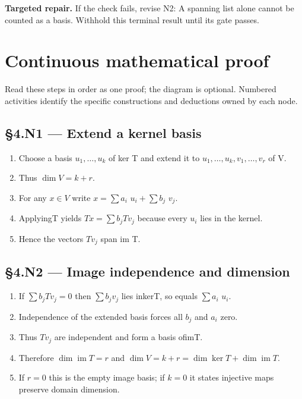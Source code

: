 \documentclass[preprint,12pt,aps,pra,showkeys,amsmath,amssymb,superscriptaddress,floatfix]{revtex4-2}
\theoremstyle{definition}
\theoremstyle{remark}
\newcommand{\field}[2]{\par\smallskip\noindent\textbf{#1.} #2\par}
\begin{document}
\field{Targeted repair}{If the check fails, revise N2: A spanning list alone cannot be counted
as a basis. Withhold this terminal result until its gate passes.}

\endgroup\clearpage\section{Continuous mathematical proof}\label{sec:proof}

Read these steps in order as one proof; the diagram is optional.
Numbered activities identify the specific constructions and deductions
owned by each node.

\subsection{§4.N1 --- Extend a kernel
basis}\label{n1-extend-a-kernel-basis}

\begin{enumerate}
\def\labelenumi{\arabic{enumi}.}
\item
  Choose a basis \(u_{1},\ldots ,u_k\) of ker T and extend it to
  \(u_{1},\ldots ,u_k,v_{1},\ldots ,v_r\) of V.
\item
  Thus \(\operatorname{dim} V=k+r\).
\item
  For any \(x\in V\) write \(x=\sum a_i\) \(u_i+\sum b_j\) \(v_j\).
\item
  ApplyingT yields \(Tx=\sum b_jTv_j\) because every \(u_i\) lies in the
  kernel.
\item
  Hence the vectors \(Tv_j\) span im T.
\end{enumerate}

\subsection{§4.N2 --- Image independence and
dimension}\label{n2-image-independence-and-dimension}

\begin{enumerate}
\def\labelenumi{\arabic{enumi}.}
\item
  If \(\sum b_jTv_j=0\) then \(\sum b_jv_j\) lies inkerT, so equals
  \(\sum a_i\) \(u_i\).
\item
  Independence of the extended basis forces all \(b_j\) and \(a_i\)
  zero.
\item
  Thus \(Tv_j\) are independent and form a basis ofimT.
\item
  Therefore \(\dim\operatorname{im} T=r\) and
  \(\operatorname{dim} V=k+r=\dim\ker T+\dim\operatorname{im} T\).
\item
  If \(r=0\) this is the empty image basis; if \(k=0\) it states
  injective maps preserve domain dimension.
\end{enumerate}
\end{document}
